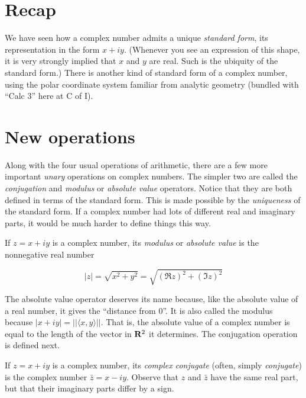 \documentclass[twocolumn,12pt]{article}
\date{February 13, 2013 (Wed)}
\begin{document}
\makeheader

\begin{summary}
\end{summary}

\section{Recap}
We have seen how a complex number admits a unique \emph{standard form}, its representation in the form $x + iy$. (Whenever you see an expression of this shape, it is very strongly implied that $x$ and $y$ are real. Such is the ubiquity of the standard form.) There is another kind of standard form of a complex number, using the polar coordinate system familiar from analytic geometry (bundled with ``Calc 3'' here at C of I).

\section{New operations}
Along with the four usual operations of arithmetic, there are a few more important \emph{unary} operations on complex numbers. The simpler two are called the \emph{conjugation} and \emph{modulus} or \emph{absolute value} operators. Notice that they are both defined in terms of the standard form. This is made possible by the \emph{uniqueness} of the standard form. If a complex number had lots of different real and imaginary parts, it would be much harder to define things this way.
%
\begin{definition}
  If $z = x+iy$ is a complex number, its \emph{modulus} or \emph{absolute value} is the nonnegative real number
  \begin{gridenv}
  \[
      |z| = \sqrt{x^2 + y^2} = \sqrt{(\Re{z})^2 + (\Im{z})^2}
    \]
  \end{gridenv}
\end{definition}
%
The absolute value operator deserves its name because, like the absolute value of a real number, it gives the ``distance from 0''. It is also called the modulus because $|x+iy| = ||\langle x, y \rangle||$. That is, the absolute value of a complex number is equal to the length of the vector in $\mathbf{R}^2$ it determines. The conjugation operation is defined next.
\begin{definition}
  If $z = x + iy$ is a complex number, its \emph{complex conjugate} (often, simply \emph{conjugate}) is the complex number $\bar{z} = x - iy$. Observe that $z$ and $\bar{z}$ have the same real part, but that their imaginary parts differ by a sign.
\end{definition}
\end{document}
